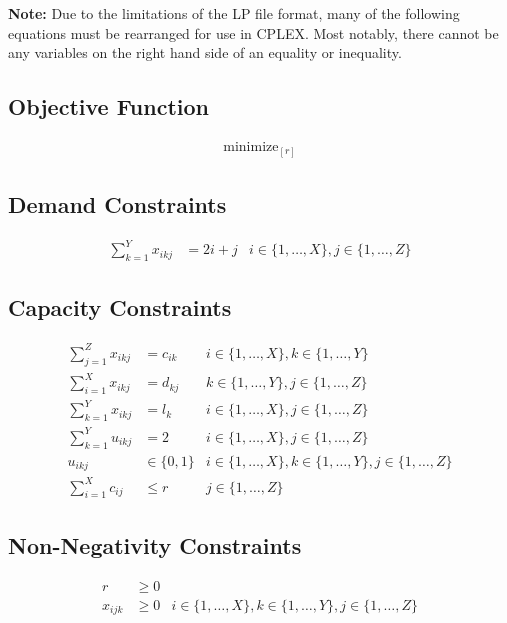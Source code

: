 \documentclass[12pt]{article} %
\begin{document}
\noindent \textbf{Note:} Due to the limitations of the LP file format, many of the following equations must be rearranged for use in CPLEX. Most notably, there cannot be any variables on the right hand side of an equality or inequality.

\subsection{Objective Function}

\begin{align}
\text{minimize}_{[r]}
\end{align}

\subsection{Demand Constraints}

\begin{align}
\sum_{k = 1}^{Y} x_{ikj} &= 2i + j & i \in \{1, \ldots, X\}, j \in \{1, \ldots, Z\}
\end{align}

\subsection{Capacity Constraints}

\begin{align}
\sum_{j = 1}^{Z} x_{ikj} &= c_{ik} & i \in \{1, \ldots, X\}, k \in \{1, \ldots, Y\} \\[1em]
\sum_{i = 1}^{X} x_{ikj} &= d_{kj} & k \in \{1, \ldots, Y\}, j \in \{1, \ldots, Z\} \\[1em]
\sum_{k = 1}^{Y} x_{ikj} &= l_k & i \in \{1, \ldots, X\}, j \in \{1, \ldots, Z\} \\[1em]
\sum_{k = 1}^{Y} u_{ikj} &= 2 & i \in \{1, \ldots, X\}, j \in \{1, \ldots, Z\} \\[1em]
u_{ikj} &\in \{0, 1\} & i \in \{1, \ldots, X\}, k \in \{1, \ldots, Y\}, j \in \{1, \ldots, Z\} \\[1em]
\sum_{i = 1}^{X} c_{ij} &\leq r & j \in \{1, \ldots, Z\}
\end{align}

\subsection{Non-Negativity Constraints}

\begin{align}
r &\geq 0 \\[1em]
x_{ijk} &\geq 0 & i \in \{1, \ldots, X\}, k \in \{1, \ldots, Y\}, j \in \{1, \ldots, Z\}
\end{align}
\end{document}
